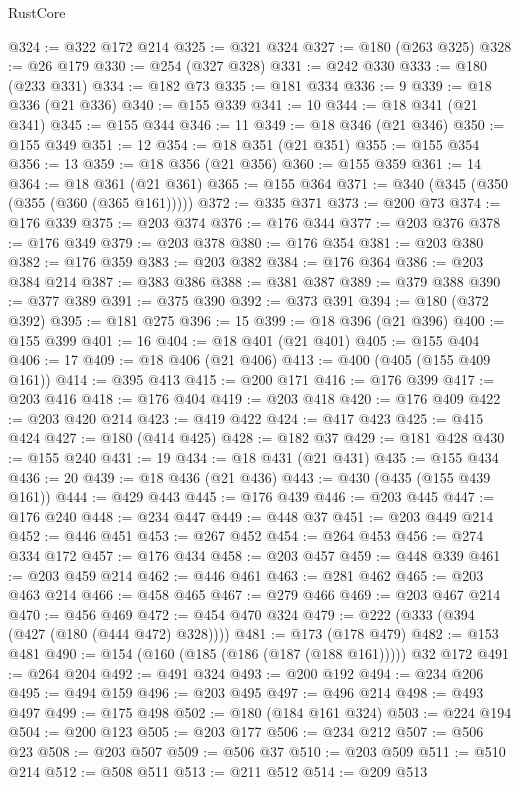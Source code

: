 \begin{lexlean}{RustCore}
\begin{coremodule}
@324 := @322 @172 @214
@325 := @321 @324
@327 := @180 (@263 @325)
@328 := @26 @179
@330 := @254 (@327 @328)
@331 := @242 @330
@333 := @180 (@233 @331)
@334 := @182 @73
@335 := @181 @334
@336 := 9
@339 := @18 @336 (@21 @336)
@340 := @155 @339
@341 := 10
@344 := @18 @341 (@21 @341)
@345 := @155 @344
@346 := 11
@349 := @18 @346 (@21 @346)
@350 := @155 @349
@351 := 12
@354 := @18 @351 (@21 @351)
@355 := @155 @354
@356 := 13
@359 := @18 @356 (@21 @356)
@360 := @155 @359
@361 := 14
@364 := @18 @361 (@21 @361)
@365 := @155 @364
@371 := @340 (@345 (@350 (@355 (@360 (@365 @161)))))
@372 := @335 @371
@373 := @200 @73
@374 := @176 @339
@375 := @203 @374
@376 := @176 @344
@377 := @203 @376
@378 := @176 @349
@379 := @203 @378
@380 := @176 @354
@381 := @203 @380
@382 := @176 @359
@383 := @203 @382
@384 := @176 @364
@386 := @203 @384 @214
@387 := @383 @386
@388 := @381 @387
@389 := @379 @388
@390 := @377 @389
@391 := @375 @390
@392 := @373 @391
@394 := @180 (@372 @392)
@395 := @181 @275
@396 := 15
@399 := @18 @396 (@21 @396)
@400 := @155 @399
@401 := 16
@404 := @18 @401 (@21 @401)
@405 := @155 @404
@406 := 17
@409 := @18 @406 (@21 @406)
@413 := @400 (@405 (@155 @409 @161))
@414 := @395 @413
@415 := @200 @171
@416 := @176 @399
@417 := @203 @416
@418 := @176 @404
@419 := @203 @418
@420 := @176 @409
@422 := @203 @420 @214
@423 := @419 @422
@424 := @417 @423
@425 := @415 @424
@427 := @180 (@414 @425)
@428 := @182 @37
@429 := @181 @428
@430 := @155 @240
@431 := 19
@434 := @18 @431 (@21 @431)
@435 := @155 @434
@436 := 20
@439 := @18 @436 (@21 @436)
@443 := @430 (@435 (@155 @439 @161))
@444 := @429 @443
@445 := @176 @439
@446 := @203 @445
@447 := @176 @240
@448 := @234 @447
@449 := @448 @37
@451 := @203 @449 @214
@452 := @446 @451
@453 := @267 @452
@454 := @264 @453
@456 := @274 @334 @172
@457 := @176 @434
@458 := @203 @457
@459 := @448 @339
@461 := @203 @459 @214
@462 := @446 @461
@463 := @281 @462
@465 := @203 @463 @214
@466 := @458 @465
@467 := @279 @466
@469 := @203 @467 @214
@470 := @456 @469
@472 := @454 @470 @324
@479 := @222 (@333 (@394 (@427 (@180 (@444 @472) @328))))
@481 := @173 (@178 @479)
@482 := @153 @481
@490 := @154 (@160 (@185 (@186 (@187 (@188 @161))))) @32 @172
@491 := @264 @204
@492 := @491 @324
@493 := @200 @192
@494 := @234 @206
@495 := @494 @159
@496 := @203 @495
@497 := @496 @214
@498 := @493 @497
@499 := @175 @498
@502 := @180 (@184 @161 @324)
@503 := @224 @194
@504 := @200 @123
@505 := @203 @177
@506 := @234 @212
@507 := @506 @23
@508 := @203 @507
@509 := @506 @37
@510 := @203 @509
@511 := @510 @214
@512 := @508 @511
@513 := @211 @512
@514 := @209 @513

\end{coremodule}
\end{lexlean}
